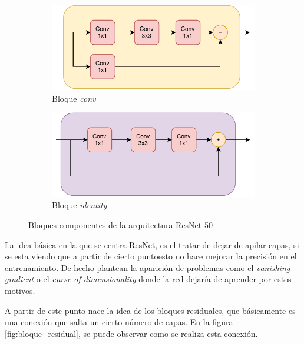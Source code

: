 \begin{itemize}
    \begin{figure}[h]
    \centering
    \begin{subfigure}{0.55\textwidth}
        \centering
        \includegraphics[width=\textwidth]{figuras/desarrollo teorico/desarrollo_teorico-ResNet 50-conv.pdf} 
        \caption{Bloque \textit{conv}}
        \label{fig:conv_bloque}
    \end{subfigure}
    \hfill
    \begin{subfigure}{0.55\textwidth}
        \centering
        \includegraphics[width=\textwidth]{figuras/desarrollo teorico/desarrollo_teorico-ResNet 50-identity.pdf} 
        \caption{Bloque \textit{identity}}
        \label{fig:identity_bloque}
    \end{subfigure}
    \caption{Bloques componentes de la arquitectura ResNet-50}
    \label{fig:bloques_resnet50}
    \end{figure}

    
    La idea básica en la que se centra ResNet, es el tratar de dejar de apilar capas, si se esta viendo que a partir de cierto puntoesto no hace mejorar la precisión en el entrenamiento. De hecho plantean la aparición de problemas como el \textit{vanishing gradient} o el \textit{curse of dimensionality} donde la red dejaría de aprender por estos motivos.
    
    A partir de este punto nace la idea de los bloques residuales, que básicamente es una conexión que salta un cierto número de capas. En la figura \ref{fig:bloque_residual}, se puede observar como se realiza esta conexión.
    

\end{itemize}
